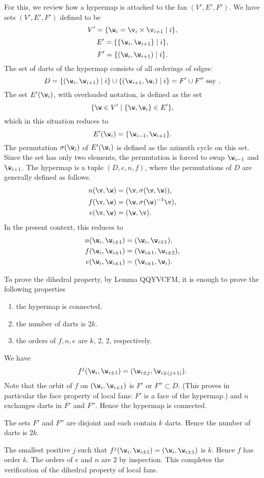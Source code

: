 For this, we review how
a hypermap is attached to the fan $(V',E',F')$.
We have sets $(V',E',F')$ defined to be
\[
V' = \{ \w_i = \v_i \times \v_{i+1}\mid i\},
\]
\[
E' = \{\{\w_i,\w_{i+1}\}\mid i\},
\]
\[
F' = \{(\w_i,\w_{i+1})\mid i\}.
\]
The set of darts of the hypermap consists of all orderings of edges:
\[
D  =\{(\w_i,\w_{i+1}) \mid i\} \cup \{(\w_{i+1},\w_i)\mid i\} = F' \cup F'' \text{ say }.
\]
The set $E'(\w_i)$, with overloaded notation, is defined as the set
\[
\{\w\in V' \mid \{\w,\w_i\}\in E'\},
\]
which in this situation reduces to
\[
E'(\w_i) = \{\w_{i-1},\w_{i+1}\}.
\]
The permutation $\sigma(\w_i)$ of $E'(\w_i)$ is defined as the azimuth
cycle on this set.  Since the set has only two elements, the permutation is
forced to swap $\w_{i-1}$ and $\w_{i+1}$.
The hypermap is a tuple $(D,e,n,f)$, where the permutations of $D$ are
generally defined as follows.
\begin{align*}n(\v,\w) &= (\v,\sigma(\v,\w)),\\
f (\v,\w) &= (\w,\sigma(\w)^{-1} \v),\\
e (\v,\w) &= (\w,\v).
\end{align*}
In the present context, this reduces to
\begin{align*}n(\w_i,\w_{i\pm 1}) &= (\w_i,\w_{i\mp 1}),\\
f (\w_i,\w_{i\pm1}) &= (\w_{i\pm1},\w_{i\pm2}),\\
e (\w_i,\w_{i\pm 1}) &= (\w_{i\pm 1},\w_i).
\end{align*}

To prove the dihedral property, by Lemma QQYVCFM, it is enough
to prove the following properties
\begin{enumerate}
\item the hypermap is connected.
\item the number of darts is $2k$.
\item the orders of $f,n,e$ are $k$, $2$, $2$, respectively.
\end{enumerate}

We have 
\[
f^j(\w_i,\w_{i\pm1}) = (\w_{i\pm j},\w_{i\pm (j+1)}).
\]
Note that the orbit of $f$ on $(\w_i,\w_{i\pm1})$ is $F'$ or $F''\subset D$.
(This proves in particular the face property of local fans: $F'$ is a face of the
hypermap.)
and $n$ exchanges darts in $F'$ and $F''$.  Hence the hypermap is connected.

The sets $F'$ and $F''$ are disjoint and each contain $k$ darts.  Hence
the number of darts is $2k$.

The smallest positive $j$ such that $f^j(\w_i,\w_{i\pm1}) = (\w_i,\w_{i\pm1})$
is $k$.  Hence $f$ has order $k$.  The orders of $e$ and $n$ are $2$ by
inspection.  This completes the verification of the dihedral property of
local fans.

